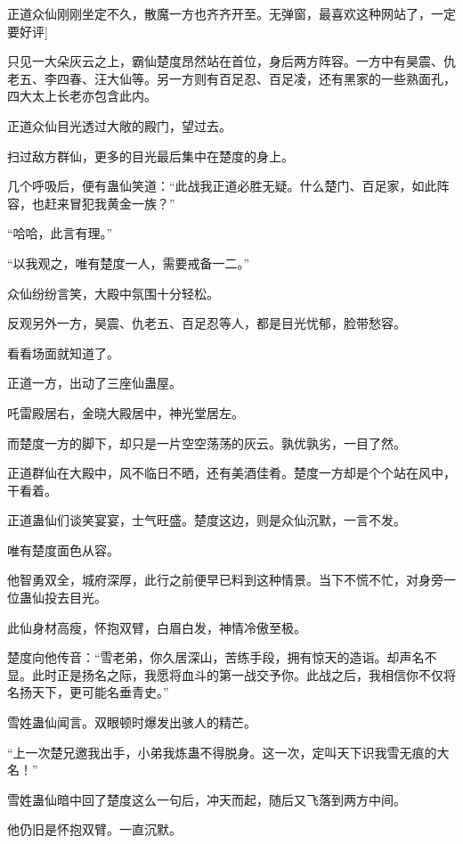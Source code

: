 
\begin{this_body}

正道众仙刚刚坐定不久，散魔一方也齐齐开至。无弹窗，最喜欢这种网站了，一定要好评]

只见一大朵灰云之上，霸仙楚度昂然站在首位，身后两方阵容。一方中有昊震、仇老五、李四春、汪大仙等。另一方则有百足忍、百足凌，还有黑家的一些熟面孔，四大太上长老亦包含此内。

正道众仙目光透过大敞的殿门，望过去。

扫过敌方群仙，更多的目光最后集中在楚度的身上。

几个呼吸后，便有蛊仙笑道：“此战我正道必胜无疑。什么楚门、百足家，如此阵容，也赶来冒犯我黄金一族？”

“哈哈，此言有理。”

“以我观之，唯有楚度一人，需要戒备一二。”

众仙纷纷言笑，大殿中氛围十分轻松。

反观另外一方，昊震、仇老五、百足忍等人，都是目光忧郁，脸带愁容。

看看场面就知道了。

正道一方，出动了三座仙蛊屋。

吒雷殿居右，金晓大殿居中，神光堂居左。

而楚度一方的脚下，却只是一片空空荡荡的灰云。孰优孰劣，一目了然。

正道群仙在大殿中，风不临日不晒，还有美酒佳肴。楚度一方却是个个站在风中，干看着。

正道蛊仙们谈笑宴宴，士气旺盛。楚度这边，则是众仙沉默，一言不发。

唯有楚度面色从容。

他智勇双全，城府深厚，此行之前便早已料到这种情景。当下不慌不忙，对身旁一位蛊仙投去目光。

此仙身材高瘦，怀抱双臂，白眉白发，神情冷傲至极。

楚度向他传音：“雪老弟，你久居深山，苦练手段，拥有惊天的造诣。却声名不显。此时正是扬名之际，我愿将血斗的第一战交予你。此战之后，我相信你不仅将名扬天下，更可能名垂青史。”

雪姓蛊仙闻言。双眼顿时爆发出骇人的精芒。

“上一次楚兄邀我出手，小弟我炼蛊不得脱身。这一次，定叫天下识我雪无痕的大名！”

雪姓蛊仙暗中回了楚度这么一句后，冲天而起，随后又飞落到两方中间。

他仍旧是怀抱双臂。一直沉默。


\end{this_body}
